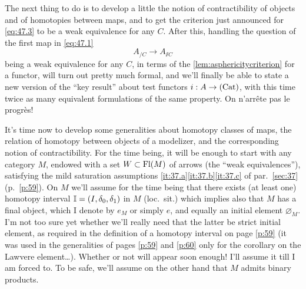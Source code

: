 The next thing to do is to develop a little the notion of
contractibility of objects and of homotopies between maps, and to get
the criterion just announced for \eqref{eq:47.3} to be a weak
equivalence for any $C$. After this, handling the question of the
first map in \eqref{eq:47.1}
\begin{equation}
  \label{eq:47.4}
  A_{/C} \to A_{\sslash C}
  \tag{4}
\end{equation}
being a weak equivalence for any $C$, in terms of the
\ref{lem:asphericitycriterion} for a functor, will turn out pretty
much formal, and we'll finally be able to state a new version of the
``key result'' about test functors $i:A\to{\ensuremath{(\mathrm{Cat})}}$, with this time twice
as many equivalent formulations of the same property. On n'arr\^ete
pas le progr\`es!

\bigbreak
\presectionfill{}\par

\label{sec:48}%
It's time now to develop some generalities about homotopy classes of
maps, the relation of homotopy between objects of a modelizer, and the
corresponding notion of contractibility. For the time being, it will
be enough to start with any category $M$, endowed with a set
$W\subset\operatorname{Fl}(M)$ of arrows (the ``weak equivalences''), satisfying the
mild saturation assumptions \ref{it:37.a}\ref{it:37.b}\ref{it:37.c} of
par.\ \ref{sec:37} (p.\ \ref{p:59}). On $M$ we'll assume for the time
being that there exists (at least one) homotopy interval
${\mathbb{I}} = (I,\delta_0,\delta_1)$ in $M$ (loc.\ sit.) which implies also
that $M$ has a final object, which I denote by $e_M$ or simply $e$,
and equally an initial element $\varnothing_M$. I'm not too sure yet
whether we'll really need that the latter be strict initial element,
as required in the definition of a homotopy interval on page
\ref{p:59} (it was used in the generalities of pages \ref{p:59} and
\ref{p:60} only for the corollary on the Lawvere
element\ldots). Whether or not will appear soon enough! I'll assume it
till I am forced to. To be safe, we'll assume on the other hand that
$M$ admits binary products.

